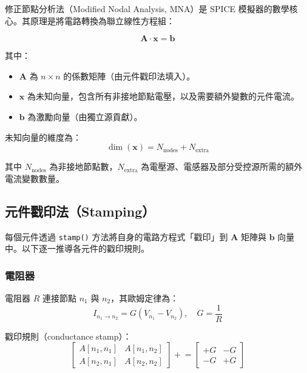 \documentclass[12pt,a4paper]{article}
\begin{document}
修正節點分析法（Modified Nodal Analysis, MNA）是 SPICE 模擬器的數學核心。其原理是將電路轉換為聯立線性方程組：

\begin{equation}
\mathbf{A} \cdot \mathbf{x} = \mathbf{b}
\label{eq:mna}
\end{equation}

\noindent 其中：
\begin{itemize}
  \item $\mathbf{A}$ 為 $n \times n$ 的係數矩陣（由元件戳印法填入）。
  \item $\mathbf{x}$ 為未知向量，包含所有非接地節點電壓，以及需要額外變數的元件電流。
  \item $\mathbf{b}$ 為激勵向量（由獨立源貢獻）。
\end{itemize}

\noindent 未知向量的維度為：
\begin{equation}
\dim(\mathbf{x}) = N_{\text{nodes}} + N_{\text{extra}}
\end{equation}

\noindent 其中 $N_{\text{nodes}}$ 為非接地節點數，$N_{\text{extra}}$ 為電壓源、電感器及部分受控源所需的額外電流變數數量。

\subsection{元件戳印法（Stamping）}

每個元件透過 \texttt{stamp()} 方法將自身的電路方程式「戳印」到 $\mathbf{A}$ 矩陣與 $\mathbf{b}$ 向量中。以下逐一推導各元件的戳印規則。

\subsubsection{電阻器}

電阻器 $R$ 連接節點 $n_1$ 與 $n_2$，其歐姆定律為：
\begin{equation}
I_{n_1 \to n_2} = G(V_{n_1} - V_{n_2}), \quad G = \frac{1}{R}
\end{equation}

戳印規則（conductance stamp）：
\begin{equation}
\begin{bmatrix}
A[n_1,n_1] & A[n_1,n_2] \\
A[n_2,n_1] & A[n_2,n_2]
\end{bmatrix}
\mathrel{+}=
\begin{bmatrix}
+G & -G \\
-G & +G
\end{bmatrix}
\end{equation}
\end{document}
